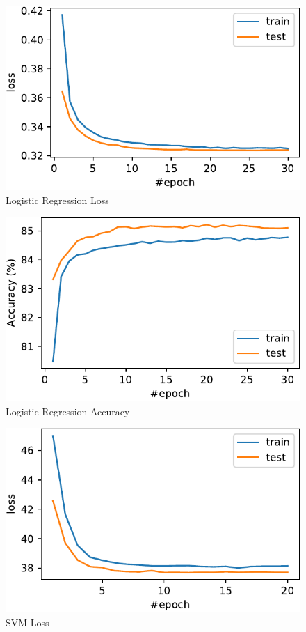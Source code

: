 \documentclass[journal, a4paper]{IEEEtran}
\begin{document}
\begin{figure}
    \includegraphics[width=\linewidth]{figures/lr/loss.pdf}
    \caption{Logistic Regression Loss}
    \label{figure:lr-loss}
\end{figure}

\begin{figure}
    \includegraphics[width=\linewidth]{figures/lr/acc.pdf}
    \caption{Logistic Regression Accuracy}
    \label{figure:lr-acc}
\end{figure}

\begin{figure}
    \includegraphics[width=\linewidth]{figures/svm/loss.pdf}
    \caption{SVM Loss}
    \label{figure:svm-loss}
\end{figure}
\end{document}
